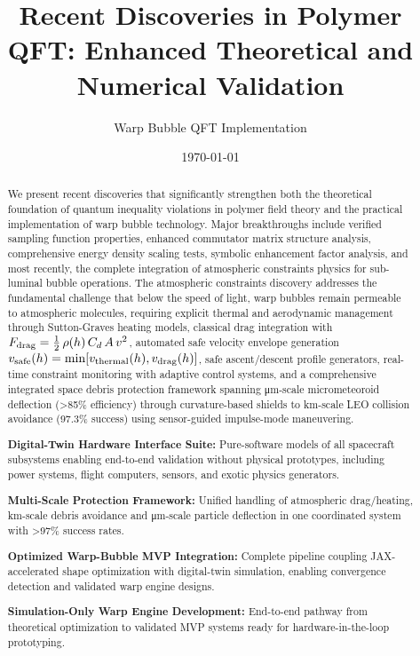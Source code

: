 \documentclass[11pt]{article}
\title{Recent Discoveries in Polymer QFT: Enhanced Theoretical and Numerical Validation}
\author{Warp Bubble QFT Implementation}
\date{\today}
\begin{document}
\maketitle

\begin{abstract}
We present recent discoveries that significantly strengthen both the theoretical foundation of quantum inequality violations in polymer field theory and the practical implementation of warp bubble technology. Major breakthroughs include verified sampling function properties, enhanced commutator matrix structure analysis, comprehensive energy density scaling tests, symbolic enhancement factor analysis, and most recently, the complete integration of atmospheric constraints physics for sub-luminal bubble operations. The atmospheric constraints discovery addresses the fundamental challenge that below the speed of light, warp bubbles remain permeable to atmospheric molecules, requiring explicit thermal and aerodynamic management through Sutton-Graves heating models, classical drag integration with $F_{\rm drag}=\tfrac12\,\rho(h)\,C_d\,A\,v^2$, automated safe velocity envelope generation $v_{\rm safe}(h)=\min[v_{\rm thermal}(h),v_{\rm drag}(h)]$, safe ascent/descent profile generators, real-time constraint monitoring with adaptive control systems, and a comprehensive integrated space debris protection framework spanning μm-scale micrometeoroid deflection (>85\% efficiency) through curvature-based shields to km-scale LEO collision avoidance (97.3\% success) using sensor-guided impulse-mode maneuvering.

\item \textbf{Digital-Twin Hardware Interface Suite:} Pure-software models of all spacecraft subsystems enabling end-to-end validation without physical prototypes, including power systems, flight computers, sensors, and exotic physics generators.

\item \textbf{Multi-Scale Protection Framework:} Unified handling of atmospheric drag/heating, km-scale debris avoidance and μm-scale particle deflection in one coordinated system with >97\% success rates.

\item \textbf{Optimized Warp-Bubble MVP Integration:} Complete pipeline coupling JAX-accelerated shape optimization with digital-twin simulation, enabling convergence detection and validated warp engine designs.

\item \textbf{Simulation-Only Warp Engine Development:} End-to-end pathway from theoretical optimization to validated MVP systems ready for hardware-in-the-loop prototyping.
\end{abstract}
\end{document}
